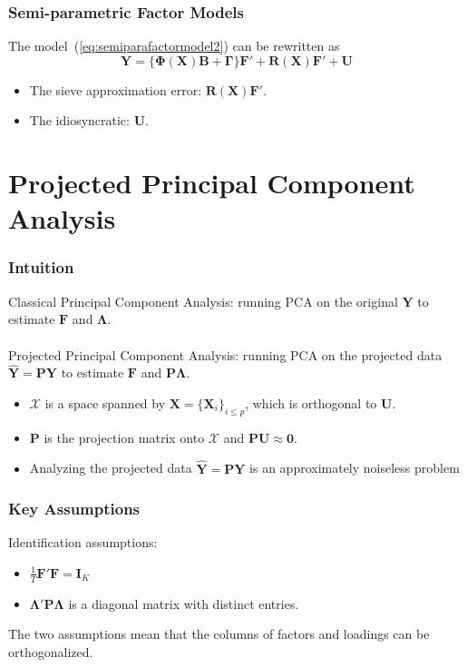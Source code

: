\documentclass{beamer}
\newcommand{\bB}{\mathbf B}
\newcommand{\bF}{\mathbf F}
\newcommand{\bI}{\mathbf I}
\newcommand{\bP}{\mathbf P}
\newcommand{\bR}{\mathbf R}
\newcommand{\bU}{\mathbf U}
\newcommand{\bX}{\mathbf X}
\newcommand{\bY}{\mathbf Y}
\newcommand{\bLambda}{\boldsymbol{\Lambda}}
\newcommand{\bGamma}{\boldsymbol{\Gamma}}
\newcommand{\bPhi}{\boldsymbol{\Phi}}
\begin{document}

\begin{frame}
\frametitle{Semi-parametric Factor Models}
The model~(\ref{eq:semiparafactormodel2}) can be rewritten as
\begin{equation}
\bY = \{\bPhi(\bX) \bB + \bGamma \}\bF' + \bR(\bX)\bF' + \bU
\end{equation}	
\begin{itemize}
	\item The sieve approximation error: $\bR(\bX)\bF'$.
	\item The idiosyncratic: $\bU$.
\end{itemize}
	
\end{frame}

\section{Projected Principal Component Analysis}

\begin{frame}
\frametitle{Intuition}
Classical Principal Component Analysis: running PCA on the original $\bY$ to estimate $\bF$ and $\bLambda$.\\~\\

Projected Principal Component Analysis: running PCA on the projected data $\hat{\bY} = \bP \bY$ to estimate $\bF$ and $\bP \bLambda$.
\begin{itemize}	
\item $\mathcal{X}$ is a space spanned by $\bX = \{\bX_i\}_{i \leq p}$, which is orthogonal to $\bU$.
\item $\bP$ is the projection matrix onto $\mathcal{X}$ and $\bP \bU \approx \mathbf{0}$.
\item  Analyzing the projected data $\hat{\bY} = \bP \bY$ is an approximately noiseless problem
\end{itemize}
	
\end{frame}



\begin{frame}
\frametitle{Key Assumptions}

Identification assumptions:
\begin{itemize}
	\item $\frac{1}{T} \bF'\bF = \bI_K$
	\item $\bLambda' \bP \bLambda$ is a diagonal matrix with distinct entries.
\end{itemize}
The two assumptions mean that the columns of factors and loadings can be orthogonalized.



\end{frame}
\end{document}
